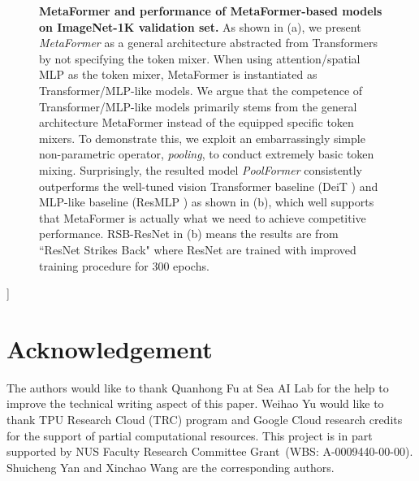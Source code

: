 \documentclass[10pt,twocolumn,letterpaper]{article}
\begin{document}
{\begin{figure}[H]
\begin{subfigure}[b]{0.42\textwidth}
     \caption{}
\end{subfigure}
\vspace{-2.6mm}
\caption{
\textbf{MetaFormer and performance of MetaFormer-based models on ImageNet-1K validation set.} As shown in (a),  we present \textit{MetaFormer} as a general architecture abstracted from Transformers~\cite{transformer} by not specifying the token mixer. When using attention/spatial MLP as the token mixer, MetaFormer is instantiated as Transformer/MLP-like models. We argue that the competence of Transformer/MLP-like models primarily stems from the general architecture MetaFormer instead of the equipped specific token mixers. To demonstrate this, we exploit an embarrassingly simple non-parametric operator, \textit{pooling}, to conduct extremely basic token mixing. Surprisingly, the resulted model \textit{PoolFormer} consistently outperforms the well-tuned vision Transformer \cite{vit} baseline (DeiT \cite{deit}) and MLP-like \cite{mlp-mixer} baseline (ResMLP \cite{resmlp}) as shown in (b), which well supports that MetaFormer is actually what we need to achieve competitive performance. RSB-ResNet in (b) means the results are from ``ResNet Strikes Back" \cite{resnet_improved} where ResNet \cite{resnet} are trained with improved training procedure for 300 epochs.
}
\label{fig:first_figure}
\vspace{-3mm}
\end{figure}
}]










\section*{Acknowledgement}
The authors would like to thank Quanhong Fu at Sea AI Lab for the help to improve the technical writing aspect of this paper. Weihao Yu would like to thank TPU Research Cloud (TRC) program and Google Cloud research credits for the support of partial computational resources.
This project is in part supported by NUS Faculty Research Committee Grant~(WBS: A-0009440-00-00). Shuicheng Yan and Xinchao Wang are the corresponding authors.

{\small


}

\newpage
\appendix

\end{document}
